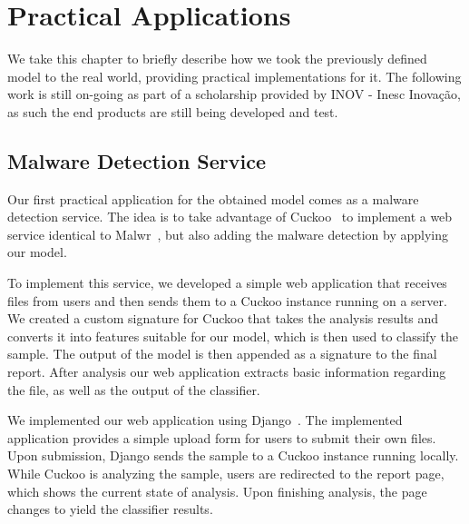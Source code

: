 
\chapter{Practical Applications}
\label{chapter:practical_applications}

We take this chapter to briefly describe how we took the previously defined model to the real world, providing practical implementations for it.
The following work is still on-going as part of a scholarship provided by INOV - Inesc Inovação, as such the end products are still being developed and test.

\section{Malware Detection Service}
\label{section:malware_service}

Our first practical application for the obtained model comes as a malware detection service.
The idea is to take advantage of Cuckoo~\cite{tool:cuckoo} to implement a web service identical to Malwr~\cite{tool:malwr}, but also adding the malware detection by applying our model.

To implement this service, we developed a simple web application that receives files from users and then sends them to a Cuckoo instance running on a server.
We created a custom signature for Cuckoo that takes the analysis results and converts it into features suitable for our model, which is then used to classify the sample.
The output of the model is then appended as a signature to the final report.
After analysis our web application extracts basic information regarding the file, as well as the output of the classifier.

We implemented our web application using Django~\cite{tool:django}.
The implemented application provides a simple upload form for users to submit their own files.
Upon submission, Django sends the sample to a Cuckoo instance running locally.
While Cuckoo is analyzing the sample, users are redirected to the report page, which shows the current state of analysis.
Upon finishing analysis, the page changes to yield the classifier results.

